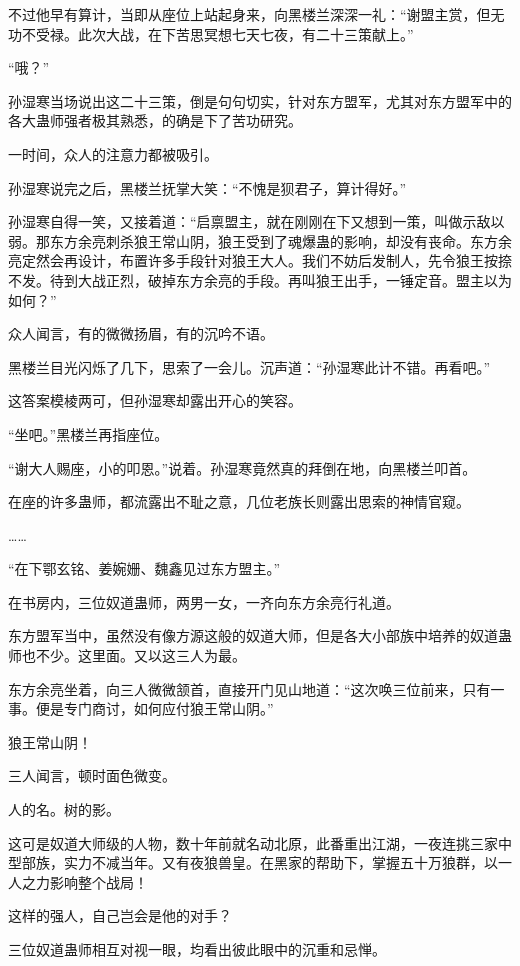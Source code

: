 \begin{this_body}
不过他早有算计，当即从座位上站起身来，向黑楼兰深深一礼：“谢盟主赏，但无功不受禄。此次大战，在下苦思冥想七天七夜，有二十三策献上。”

“哦？”

孙湿寒当场说出这二十三策，倒是句句切实，针对东方盟军，尤其对东方盟军中的各大蛊师强者极其熟悉，的确是下了苦功研究。

一时间，众人的注意力都被吸引。

孙湿寒说完之后，黑楼兰抚掌大笑：“不愧是狈君子，算计得好。”

孙湿寒自得一笑，又接着道：“启禀盟主，就在刚刚在下又想到一策，叫做示敌以弱。那东方余亮刺杀狼王常山阴，狼王受到了魂爆蛊的影响，却没有丧命。东方余亮定然会再设计，布置许多手段针对狼王大人。我们不妨后发制人，先令狼王按捺不发。待到大战正烈，破掉东方余亮的手段。再叫狼王出手，一锤定音。盟主以为如何？”

众人闻言，有的微微扬眉，有的沉吟不语。

黑楼兰目光闪烁了几下，思索了一会儿。沉声道：“孙湿寒此计不错。再看吧。”

这答案模棱两可，但孙湿寒却露出开心的笑容。

“坐吧。”黑楼兰再指座位。

“谢大人赐座，小的叩恩。”说着。孙湿寒竟然真的拜倒在地，向黑楼兰叩首。

在座的许多蛊师，都流露出不耻之意，几位老族长则露出思索的神情官窥。

……

“在下鄂玄铭、姜婉姗、魏鑫见过东方盟主。”

在书房内，三位奴道蛊师，两男一女，一齐向东方余亮行礼道。

东方盟军当中，虽然没有像方源这般的奴道大师，但是各大小部族中培养的奴道蛊师也不少。这里面。又以这三人为最。

东方余亮坐着，向三人微微颔首，直接开门见山地道：“这次唤三位前来，只有一事。便是专门商讨，如何应付狼王常山阴。”

狼王常山阴！

三人闻言，顿时面色微变。

人的名。树的影。

这可是奴道大师级的人物，数十年前就名动北原，此番重出江湖，一夜连挑三家中型部族，实力不减当年。又有夜狼兽皇。在黑家的帮助下，掌握五十万狼群，以一人之力影响整个战局！

这样的强人，自己岂会是他的对手？

三位奴道蛊师相互对视一眼，均看出彼此眼中的沉重和忌惮。


\end{this_body}

